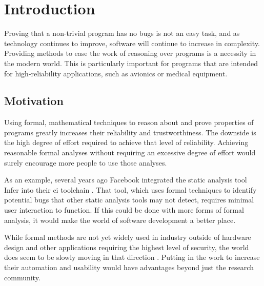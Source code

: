 \chapter{Introduction}
Proving that a non-trivial program has no bugs is not an easy task,
and as technology continues to improve,
software will continue to increase in complexity.
Providing methods to ease the work of reasoning over programs is a necessity
in the modern world.
This is particularly important for programs
that are intended for high-reliability applications,
such as avionics or medical equipment.

\section{Motivation}
Using formal, mathematical techniques to reason about and prove properties of programs
greatly increases their reliability and trustworthiness.
The downside is the high degree of effort required to achieve that level of reliability.
Achieving reasonable formal analyses without requiring an excessive degree of effort
would surely encourage more people to use those analyses.

As an example, several years ago Facebook integrated the static analysis tool Infer
into their \ac{ci} toolchain \autocite{calcagno2011infer}.
That tool, which uses formal techniques to identify potential bugs
that other static analysis tools may not detect,
requires minimal user interaction to function.
If this could be done with more forms of formal analysis,
it would make the world of software development a better place.

While formal methods are not yet widely used in industry outside of hardware design
and other applications requiring the highest level of security,
the world does seem to be slowly moving in that direction
\autocite{smackers2019,khazeev2019acceptance}.
Putting in the work to increase their automation and usability
would have advantages beyond just the research community.

